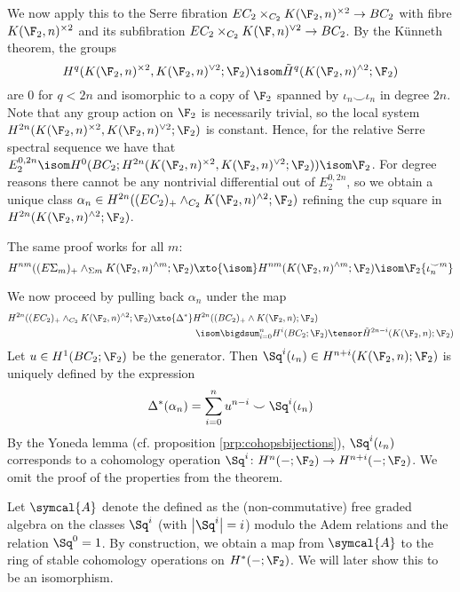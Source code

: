 We now apply this to the Serre fibration $E C_2 \times_{C_2} K(\F_2, n)^{\times 2} \to B C_2$ with fibre $K(\F_2, n)^{\times 2}$ and its subfibration $E C_2 \times_{C_2} K(\F, n)^{\vee 2} \to B C_2$.
By the Künneth theorem, the groups
\begin{equation*}
	H^q(K(\F_2, n)^{\times 2}, K(\F_2, n)^{\vee 2}; \F_2) \isom \tilde{H}^q(K(\F_2, n)^{\wedge 2}; \F_2)
\end{equation*}
are 0 for $q < 2n$ and isomorphic to a copy of $\F_2$ spanned by $\iota_n \smile \iota_n$ in degree $2n$.
Note that any group action on $\F_2$ is necessarily trivial, so the local system $H^{2n}(K(\F_2, n)^{\times 2}, K(\F_2, n)^{\vee 2}; \F_2)$ is constant.
Hence, for the relative Serre spectral sequence we have that $E_2^{0, 2n} \isom H^0(B C_2; H^{2n}(K(\F_2, n)^{\times 2}, K(\F_2, n)^{\vee 2}; \F_2)) \isom \F_2$.
For degree reasons there cannot be any nontrivial differential out of $E_2^{0, 2n}$, so we obtain a unique class $\alpha_n \in H^{2n}((E C_2)_{+} \wedge_{C_2} K(\F_2, n)^{\wedge 2}; \F_2)$ refining the cup square in $H^{2n}(K(\F_2, n)^{\wedge 2}; \F_2)$.
\begin{remark}
	The same proof works for all $m$:
	\begin{equation*}
		H^{n m}((E \Sigma_{m})_{+} \wedge_{\Sigma m} K(\F_2, n)^{\wedge m}; \F_2) \xto{\isom} H^{n m}(K(\F_2, n)^{\wedge m}; \F_2) \isom \F_2\{\iota_n^{\smile m}\}
	\end{equation*}
\end{remark}
We now proceed by pulling back $\alpha_n$ under the map 
\begin{align*}
	H^{2n}((E C_2)_+ \wedge_{C_2} K(\F_2, n)^{\wedge 2}; \F_2) \xto{\Delta^*} & H^{2n}((B C_2)_+ \wedge K(\F_2, n); \F_2) \\ 
																			  &\; \isom \bigdsum_{i = 0}^n H^i(B C_2; \F_2) \tensor \tilde{H}^{2n - i}(K(\F_2, n); \F_2)
\end{align*}
Let $u \in H^1(B C_2; \F_2)$ be the generator.
Then $\Sq^i(\iota_n) \in H^{n + i}(K(\F_2, n); \F_2)$ is uniquely defined by the expression
\begin{equation*}
	\Delta^*(\alpha_n) = \sum_{i = 0}^n u^{n - i} \smile \Sq^i(\iota_n)
\end{equation*}
By the Yoneda lemma (cf. proposition \ref{prp:cohopsbijections}), $\Sq^i(\iota_n)$ corresponds to a cohomology operation $\Sq^i\colon H^n({{-}}; \F_2) \to H^{n + i}({{-}}; \F_2)$.
We omit the proof of the properties from the theorem.

Let $\symcal{A}$ denote the  defined as the (non-commutative) free graded algebra on the classes $\Sq^i$ (with $\big|\Sq^i\big| = i$) modulo the Adem relations and the relation $\Sq^0 = 1$.
By construction, we obtain a map from $\symcal{A}$ to the ring of stable cohomology operations on $H^*({{-}}; \F_2)$.
We will later show this to be an isomorphism. 

